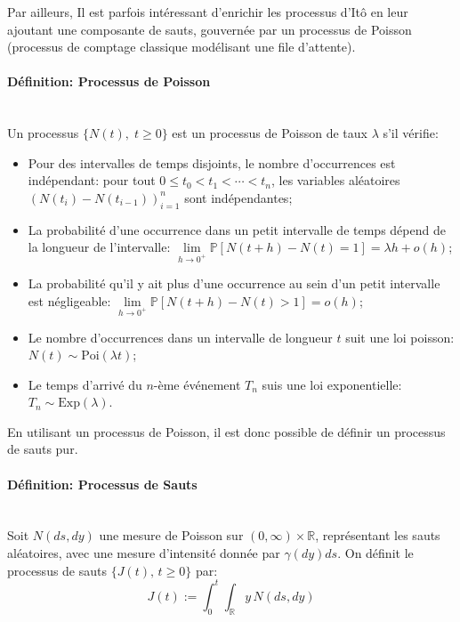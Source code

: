 Par ailleurs, Il est parfois intéressant d'enrichir les processus d'Itô en leur ajoutant une composante de sauts, gouvernée par un processus de Poisson (processus de comptage classique modélisant une file d'attente).
\paragraph{Définition: Processus de Poisson}\mbox{}\\
Un processus $\{N(t),\;t\geq0\}$ est un processus de Poisson de taux $\lambda$ s'il vérifie:
\begin{itemize}
    \item Pour des intervalles de temps disjoints, le nombre d'occurrences est indépendant: pour tout $0 \leq t_0 < t_1 < \cdots < t_n$, les variables aléatoires ${\left(N(t_i) - N(t_{i-1})\right)}_{i=1}^n$ sont indépendantes;
    \item La probabilité d'une occurrence dans un petit intervalle de temps dépend de la longueur de l'intervalle: $\underset{h\to0^+}{\lim}\mathds{P}[N(t+h)-N(t)=1]=\lambda h+o(h)$;
    \item La probabilité qu'il y ait plus d'une occurrence au sein d'un petit intervalle est négligeable: $\underset{h\to0^+}{\lim}\mathds{P}[N(t+h)-N(t)>1]=o(h)$;
    \item Le nombre d'occurrences dans un intervalle de longueur $t$ suit une loi poisson: $N(t)\sim \text{Poi}(\lambda t)$;
    \item Le temps d'arrivé du $n$-ème événement $T_n$ suis une loi exponentielle: $T_n\sim\text{Exp}(\lambda)$.
\end{itemize}
En utilisant un processus de Poisson, il est donc possible de définir un processus de sauts pur.
\paragraph{Définition: Processus de Sauts}\mbox{}\\
Soit \( N(ds,dy) \) une mesure de Poisson sur \( (0, \infty) \times \mathds{R} \), représentant les sauts aléatoires, avec une mesure d'intensité donnée par \(\gamma(dy)ds\). On définit le processus de sauts \(\{J(t),\,t \geq 0\}\) par:
\begin{equation}\label{jump_def}
    J(t) := \int_0^t \int_{\mathds{R}}y\,N(ds,dy)
\end{equation}

